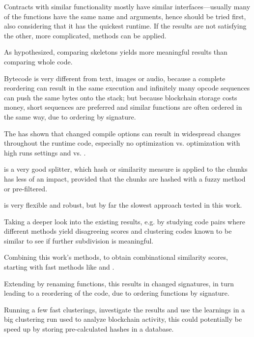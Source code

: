 \documentclass[../main.tex]{subfiles}
\begin{document}
Contracts with similar functionality mostly have similar interfaces---usually many of the functions have the same name and arguments, hence  should be tried first, also considering that it has the quickest runtime. If the results are not satisfying the other, more complicated, methods can be applied.

As hypothesized, comparing skeletons yields more meaningful results than comparing whole code.

Bytecode is very different from text, images or audio, because a complete reordering can result in the same execution and infinitely many opcode sequences can push the same bytes onto the stack; but because blockchain storage costs money, short sequences are preferred and similar functions are often ordered in the same way, due to  ordering by signature.

The \n{\solcts} has shown that changed compile options can result in widespread changes throughout the runtime code, especially no optimization vs. optimization with high runs settings and   vs. .

 is a very good splitter, which hash or similarity measure is applied to the chunks has less of an impact, provided that the chunks are hashed with a fuzzy method or pre-filtered.

 is very flexible and robust, but by far the slowest approach tested in this work.

Taking a deeper look into the existing results, e.g. by studying code pairs where different methods yield disagreeing scores and clustering codes known to be similar to see if further subdivision is meaningful.

Combining this work's methods, to obtain combinational similarity scores, starting with fast methods like  and .

Extending \n{\solcts} by renaming functions, this results in changed  signatures, in turn leading to a reordering of the code, due to  ordering functions by signature.

Running a few fast clusterings, investigate the results and use the learnings in a big clustering run used to analyze blockchain activity, this could potentially be speed up by storing pre-calculated hashes in a database.
\end{document}
